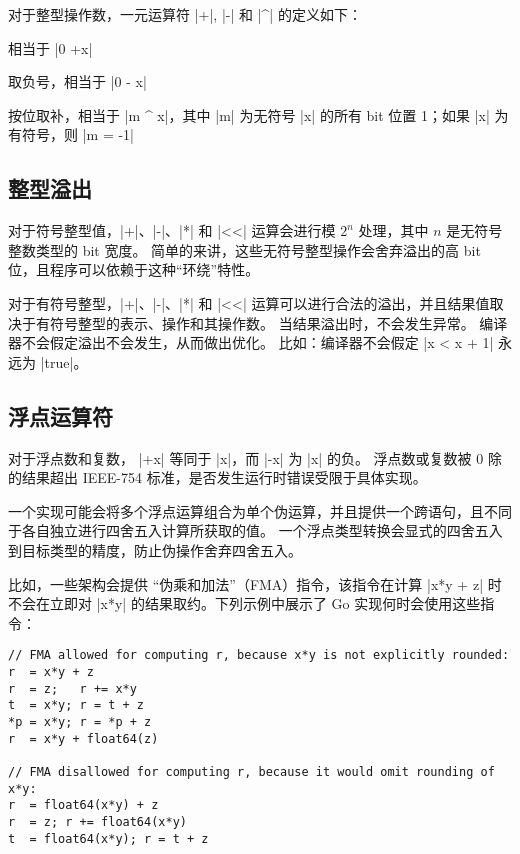 对于整型操作数，一元运算符 \code|+|, \code|-| 和 \code|^| 的定义如下：
\begin{description}[style=sameline, leftmargin=3\parindent]
\item[x] 相当于 \code|0 +x|
\item[-x] 取负号，相当于 \code|0 - x|
\item[\^{}x] 按位取补，相当于 \code|m ^ x|，其中 \code|m| 为无符号 \code|x| 的所有 bit 位置 1；如果 \code|x| 为有符号，则 \code|m = -1|
\end{description}

\subsection{整型溢出}
对于符号整型值，\code|+|、\code|-|、\code|*| 和 \code|<<| 运算会进行模 $2^n$ 处理，其中 $n$ 是无符号整数类型的 bit 宽度。
简单的来讲，这些无符号整型操作会舍弃溢出的高 bit 位，且程序可以依赖于这种``环绕''特性。

对于有符号整型，\code|+|、\code|-|、\code|*| 和 \code|<<| 运算可以进行合法的溢出，并且结果值取决于有符号整型的表示、操作和其操作数。
当结果溢出时，不会发生异常。
编译器不会假定溢出不会发生，从而做出优化。
比如：编译器不会假定 \code|x < x + 1| 永远为 \code|true|。

\subsection{浮点运算符}
对于浮点数和复数， \code|+x| 等同于 \code|x|，而 \code|-x| 为 \code|x| 的负。
浮点数或复数被 0 除的结果超出 IEEE-754 标准，是否发生运行时错误受限于具体实现。

一个实现可能会将多个浮点运算组合为单个伪运算，并且提供一个跨语句，且不同于各自独立进行四舍五入计算所获取的值。
一个浮点类型转换会显式的四舍五入到目标类型的精度，防止伪操作舍弃四舍五入。

比如，一些架构会提供 ``伪乘和加法''（FMA）指令，该指令在计算 \code|x*y + z| 时不会在立即对 \code|x*y| 的结果取约。下列示例中展示了 Go 实现何时会使用这些指令：
\begin{lstlisting}[style=golang]
// FMA allowed for computing r, because x*y is not explicitly rounded:
r  = x*y + z
r  = z;   r += x*y
t  = x*y; r = t + z
*p = x*y; r = *p + z
r  = x*y + float64(z)

// FMA disallowed for computing r, because it would omit rounding of x*y:
r  = float64(x*y) + z
r  = z; r += float64(x*y)
t  = float64(x*y); r = t + z
\end{lstlisting}

